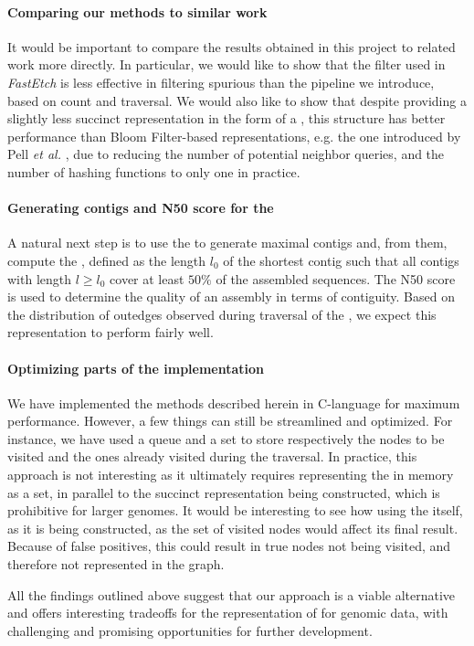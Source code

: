 \paragraph*{Comparing our methods to similar work}

It would be important to compare the results obtained in this project to related work more directly. In particular, we would like to show that the  filter used in \emph{FastEtch} \cite{Ghosh2019} is less effective in filtering spurious  than the pipeline we introduce, based on count and traversal. We would also like to show that despite providing a slightly less succinct \dBG representation in the form of a \dBHT, this structure has better performance than Bloom Filter-based representations, e.g. the one introduced by Pell \emph{et al.} \cite{Pell2012}, due to reducing the number of potential neighbor queries, and the number of hashing functions to only one in practice.

\paragraph*{Generating contigs and N50 score for the \dBHT}

A natural next step is to use the \dBHT to generate maximal contigs and, from them, compute the , defined as the length $l_0$ of the shortest contig such that all contigs with length $l \geq l_0$ cover at least $50\%$ of the assembled sequences. The N50 score is used to determine the quality of an assembly in terms of contiguity. Based on the distribution of outedges observed during traversal of the \dBHT, we expect this representation to perform fairly well.

\paragraph*{Optimizing parts of the implementation}

We have implemented the methods described herein in C-language for maximum performance. However, a few things can still be streamlined and optimized.
For instance, we have used a queue and a set to store respectively the nodes to be visited and the ones already visited during the \dBCM traversal. In practice, this approach is not interesting as it ultimately requires representing the \dBG in memory as a set, in parallel to the succinct representation being constructed, which is prohibitive for larger genomes. It would be interesting to see how using the \dBHT itself, as it is being constructed, as the set of visited nodes would affect its final result. Because of false positives, this could result in true nodes not being visited, and therefore not represented in the graph. 

\medskip

All the findings outlined above suggest that our approach is a viable alternative and offers interesting tradeoffs for the representation of  for genomic data, with challenging and promising opportunities for further development.
